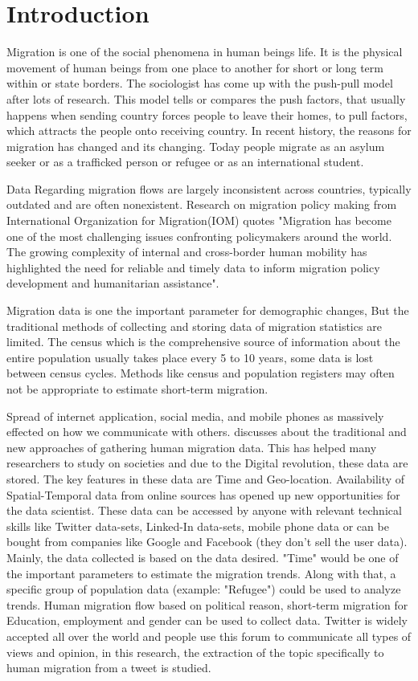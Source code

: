 \chapter{Introduction}\label{chap:introduction}
Migration is one of the social phenomena in human beings life. It is the physical movement of human beings from one place to another for short or long term within or state borders. The sociologist has come up with the push-pull model after lots of research. This model tells or compares the push factors, that usually happens when sending country forces people to leave their homes, to pull factors, which attracts the people onto receiving country. In recent history, the reasons for migration has changed and its changing. Today people migrate as an asylum seeker or as a trafficked person or refugee or as an international student.

Data Regarding migration flows are largely inconsistent across countries, typically outdated and
are often nonexistent. Research on migration policy making from International Organization for
Migration(IOM)  \cite{IOM's} quotes "Migration has become one of the most challenging issues confronting
policymakers around the world. The growing complexity of internal and cross-border human mobility
has highlighted the need for reliable and timely data to inform migration policy development
and humanitarian assistance". 

Migration data is one the important parameter for demographic changes, But the traditional methods of collecting and storing data of migration statistics are limited. The census which is the comprehensive source of information about the entire population usually takes place every 5 to 10 years, some data is lost between census cycles. Methods like census and population registers may often not be appropriate to estimate short-term migration. 

Spread of internet application, social media, and mobile phones as massively effected on how we communicate with others. \cite{Christina_Hughes_et_al.} discusses about the traditional and new approaches of gathering human migration data. This has helped many researchers to study on societies and due to the Digital revolution, these data are stored. The key features in these data are Time and Geo-location. Availability of Spatial-Temporal data from online sources has opened up new opportunities for the data scientist. These data can be accessed by anyone with relevant technical skills like Twitter data-sets, Linked-In data-sets, mobile phone data or can be bought from companies like Google and Facebook (they don't sell the user data). Mainly, the data collected is based on the data desired. "Time" would be one of the important parameters to estimate the migration trends. Along with that, a specific group of population data (example: "Refugee") could be used to analyze trends. Human migration flow based on political reason, short-term migration for Education, employment and gender can be used to collect data. Twitter is widely accepted all over the world and people use this forum to communicate all types of views and opinion, in this research, the extraction of the topic specifically to human migration from a tweet is studied. 


